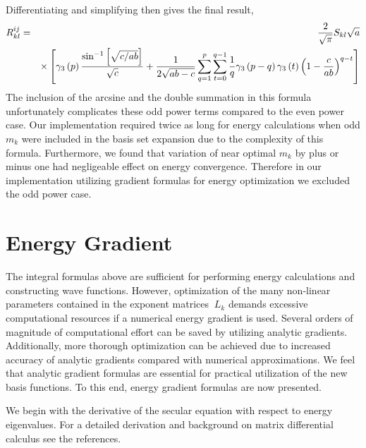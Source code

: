 \documentclass[12pt,doublespace]{article}
\begin{document}
Differentiating and simplifying then gives the final result, 
\begin{eqnarray}
R_{kl}^{ij} &=&\frac{2}{\sqrt{\pi }}S_{kl}\sqrt{a}  \notag \\
&&\times \left[ \gamma _{3}\left( p\right) \frac{\sin ^{-1}\left[ \sqrt{c/ab}%
\right] }{\sqrt{c}}+\frac{1}{2\sqrt{ab-c}}\sum_{q=1}^{p}\sum_{t=0}^{q-1}%
\frac{1}{q}\gamma _{3}\left( p-q\right) \gamma _{3}\left( t\right) \left( 1-%
\frac{c}{ab}\right) ^{q-t}\right]  \label{Rklodd}
\end{eqnarray}
The inclusion of the arcsine and the double summation in this formula
unfortunately complicates these odd power terms compared to the even power
case. Our implementation required twice as long for energy calculations when
odd $m_{k}$ were included in the basis set expansion due to the complexity
of this formula. Furthermore, we found that variation of near optimal $m_{k}$
by plus or minus one had negligeable effect on energy convergence. Therefore
in our implementation utilizing gradient formulas for energy optimization we
excluded the odd power case.

\section{Energy Gradient}

The integral formulas above are sufficient for performing energy
calculations and constructing wave functions. However, optimization of the
many non-linear parameters contained in the exponent matrices $\ L_{k}$
demands excessive computational resources if a numerical energy gradient is
used. Several orders of magnitude of computational effort can be saved by
utilizing analytic gradients. Additionally, more thorough optimization can
be achieved due to increased accuracy of analytic gradients compared with
numerical approximations. We feel that analytic gradient formulas are
essential for practical utilization of the new basis functions. To this end,
energy gradient formulas are now presented.

We begin with the derivative of the secular equation with respect to energy
eigenvalues. For a detailed derivation and background on matrix differential
calculus see the references\cite{Kinghorn95a,Kinghorn95b}.
\end{document}
